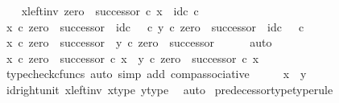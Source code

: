 \begin{isabellebody}
\ \ \isamarkupfalse%
\ x{\isacharunderscore}{\kern0pt}left{\isacharunderscore}{\kern0pt}inv{\isacharcolon}{\kern0pt}\ {\isachardoublequoteopen}zero\ {\isasymamalg}\ successor\ {\isasymcirc}\isactrlsub c\ x\ {\isacharequal}{\kern0pt}\ id\isactrlsub c\ {\isasymnat}\isactrlsub c{\isachardoublequoteclose}\isanewline
\ \ \isamarkupfalse%
\ {\isachardoublequoteopen}x\ {\isasymcirc}\isactrlsub c\ zero\ {\isasymamalg}\ successor\ {\isacharequal}{\kern0pt}\ id\isactrlsub c\ {\isacharparenleft}{\kern0pt}{\isasymone}\ {\isasymCoprod}\ {\isasymnat}\isactrlsub c{\isacharparenright}{\kern0pt}{\isachardoublequoteclose}\ {\isachardoublequoteopen}y\ {\isasymcirc}\isactrlsub c\ zero\ {\isasymamalg}\ successor\ {\isacharequal}{\kern0pt}\ id\isactrlsub c\ {\isacharparenleft}{\kern0pt}{\isasymone}\ {\isasymCoprod}\ {\isasymnat}\isactrlsub c{\isacharparenright}{\kern0pt}{\isachardoublequoteclose}\isanewline
\ \ \isamarkupfalse%
\ \isamarkupfalse%
\ {\isachardoublequoteopen}x\ {\isasymcirc}\isactrlsub c\ zero\ {\isasymamalg}\ successor\ {\isacharequal}{\kern0pt}\ y\ {\isasymcirc}\isactrlsub c\ zero\ {\isasymamalg}\ successor{\isachardoublequoteclose}\isanewline
\ \ \ \ \isamarkupfalse%
\ auto\isanewline
\ \ \isamarkupfalse%
\ \isamarkupfalse%
\ {\isachardoublequoteopen}x\ {\isasymcirc}\isactrlsub c\ zero\ {\isasymamalg}\ successor\ {\isasymcirc}\isactrlsub c\ x\ {\isacharequal}{\kern0pt}\ y\ {\isasymcirc}\isactrlsub c\ zero\ {\isasymamalg}\ successor\ {\isasymcirc}\isactrlsub c\ x{\isachardoublequoteclose}\isanewline
\ \ \ \ \isamarkupfalse%
\ {\isacharparenleft}{\kern0pt}typecheck{\isacharunderscore}{\kern0pt}cfuncs{\isacharcomma}{\kern0pt}\ auto\ simp\ add{\isacharcolon}{\kern0pt}\ comp{\isacharunderscore}{\kern0pt}associative{}{\isacharparenright}{\kern0pt}\isanewline
\ \ \isamarkupfalse%
\ \isamarkupfalse%
\ {\isachardoublequoteopen}x\ {\isacharequal}{\kern0pt}\ y{\isachardoublequoteclose}\isanewline
\ \ \ \ \isamarkupfalse%
\ id{\isacharunderscore}{\kern0pt}right{\isacharunderscore}{\kern0pt}unit{}\ x{\isacharunderscore}{\kern0pt}left{\isacharunderscore}{\kern0pt}inv\ x{\isacharunderscore}{\kern0pt}type\ y{\isacharunderscore}{\kern0pt}type\ \isamarkupfalse%
\ auto\isanewline
{}\isamarkupfalse%
%
\endisatagproof
{\isafoldproof}%
%
\isadelimproof
\isanewline
%
\endisadelimproof
\isanewline
{}\isamarkupfalse%
\ predecessor{\isacharunderscore}{\kern0pt}type{\isacharbrackleft}{\kern0pt}type{\isacharunderscore}{\kern0pt}rule{\isacharbrackright}{\kern0pt}{\isacharcolon}{\kern0pt}\isanewline

\end{isabellebody}
